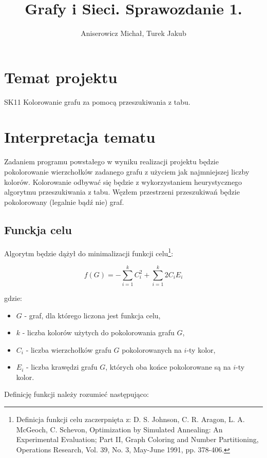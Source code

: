 \documentclass[a4paper,10pt]{article}
\title{Grafy i Sieci. Sprawozdanie 1.}
\author{Aniserowicz Michał, Turek Jakub}
\begin{document}
\maketitle

\section{Temat projektu}

SK11 Kolorowanie grafu za pomocą przeszukiwania z tabu.



\section{Interpretacja tematu}
Zadaniem programu powstałego w wyniku realizacji projektu będzie pokolorowanie wierzchołków zadanego grafu z użyciem jak najmniejszej liczby kolorów.
Kolorowanie odbywać się będzie z wykorzystaniem heurystycznego algorytmu przeszukiwania z tabu.
Węzłem przestrzeni przeszukiwań będzie pokolorowany (legalnie bądź nie) graf.

\subsection{Funckja celu}
Algorytm będzie dążył do minimalizacji funkcji celu\footnote{Definicja funkcji celu zaczerpnięta z: D. S. Johnson, C. R. Aragon, L. A. McGeoch, C. Schevon, Optimization by Simulated Annealing: An Experimental Evaluation; Part II, Graph Coloring and Number Partitioning, Operations Research, Vol. 39, No. 3, May-June 1991, pp. 378-406.}:

\begin{equation}
 f(G) = -\sum_{i=1}^{k} C_i^2 + \sum_{i=1}^{k} 2 C_i E_i
\end{equation}

gdzie:
\begin{itemize}
 \item $G$ - graf, dla którego liczona jest funkcja celu,
 \item $k$ - liczba kolorów użytych do pokolorowania grafu $G$,
 \item $C_i$ - liczba wierzchołków grafu $G$ pokolorowanych na $i$-ty kolor,
 \item $E_i$ - liczba krawędzi grafu $G$, których oba końce pokolorowane są na $i$-ty kolor.
\end{itemize}

Definicję funkcji należy rozumieć następująco:
\end{document}

